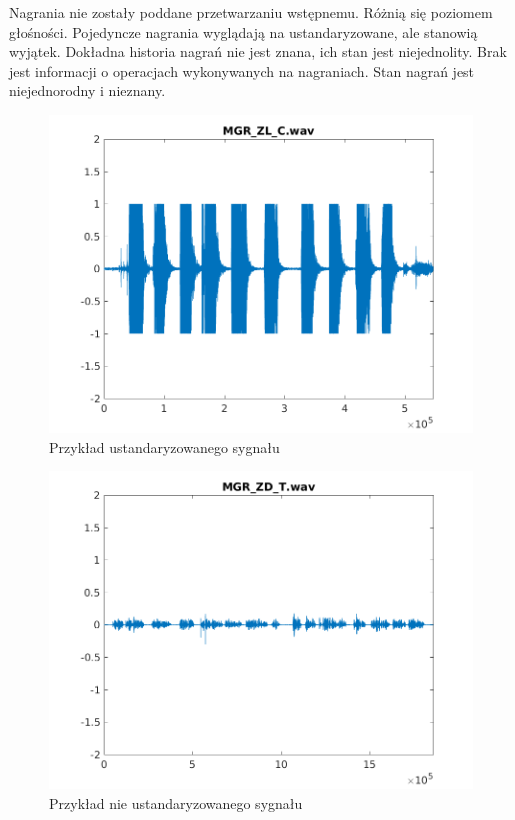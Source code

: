 \documentclass[a4paper,12pt,twoside,openany]{report}
\begin{document}
Nagrania nie zostały poddane przetwarzaniu wstępnemu. 
Różnią się poziomem głośności.
Pojedyncze nagrania wyglądają na ustandaryzowane, ale stanowią wyjątek.
Dokładna historia nagrań nie jest znana, ich stan jest niejednolity.
Brak jest informacji o operacjach wykonywanych na nagraniach.
Stan nagrań jest niejednorodny i nieznany.
\begin{figure}[h]
	\centering
	\includegraphics[width=\textwidth]{MGR_ZL_C-plot}
	\caption{Przykład ustandaryzowanego sygnału}
	\label{rys:opis:ustandaryzowany}
\end{figure}
\begin{figure}[h]
	\centering
	\includegraphics[width=\textwidth]{MGR_ZD_T-plot}
	\caption{Przykład nie ustandaryzowanego sygnału}
	\label{rys:opis:nieustandaryzowany}
\end{figure}
\end{document}
